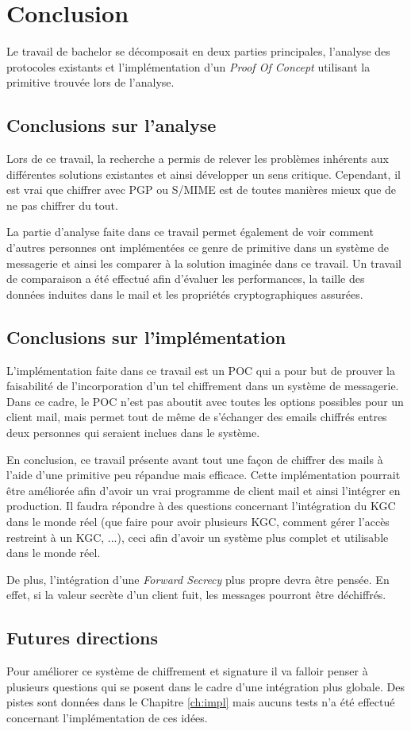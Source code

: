 \chapter{Conclusion}
\label{ch:conclusion}
Le travail de bachelor se décomposait en deux parties principales, l'analyse des protocoles existants et l'implémentation d'un \textit{Proof Of Concept} utilisant la primitive trouvée lors de l'analyse.
\section{Conclusions sur l'analyse}
Lors de ce travail, la recherche a permis de relever les problèmes inhérents aux différentes solutions existantes et ainsi développer un sens critique. Cependant, il est vrai que chiffrer avec PGP ou S/MIME est de toutes manières mieux que de ne pas chiffrer du tout.

La partie d'analyse faite dans ce travail permet également de voir comment d'autres personnes ont implémentées ce genre de primitive dans un système de messagerie et ainsi les comparer à la solution imaginée dans ce travail. Un travail de comparaison a été effectué afin d'évaluer les performances, la taille des données induites dans le mail et les propriétés cryptographiques assurées.

\section{Conclusions sur l'implémentation}
L'implémentation faite dans ce travail est un POC qui a pour but de prouver la faisabilité de l'incorporation d'un tel chiffrement dans un système de messagerie. Dans ce cadre, le POC n'est pas aboutit avec toutes les options possibles pour un client mail, mais permet tout de même de s'échanger des emails chiffrés entres deux personnes qui seraient inclues dans le système.

En conclusion, ce travail présente avant tout une façon de chiffrer des mails à l'aide d'une primitive peu répandue mais efficace. Cette implémentation pourrait être améliorée afin d'avoir un vrai programme de client mail et ainsi l'intégrer en production. Il faudra répondre à des questions concernant l'intégration du KGC dans le monde réel (que faire pour avoir plusieurs KGC, comment gérer l'accès restreint à un KGC, ...), ceci afin d'avoir un système plus complet et utilisable dans le monde réel.

De plus, l'intégration d'une \textit{Forward Secrecy} plus propre devra être pensée. En effet, si la valeur secrète d'un client fuit, les messages pourront être déchiffrés.
\section{Futures directions}
Pour améliorer ce système de chiffrement et signature il va falloir penser à plusieurs questions qui se posent dans le cadre d'une intégration plus globale. Des pistes sont données dans le Chapitre \ref{ch:impl} mais aucuns tests n'a été effectué concernant l'implémentation de ces idées.

 